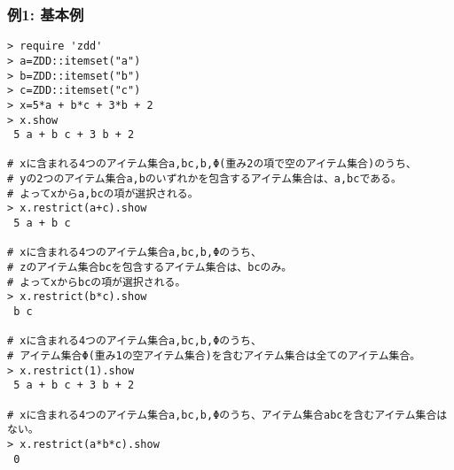\subsubsection*{例1: 基本例}



\begin{Verbatim}[baselinestretch=0.7,frame=single]
> require 'zdd'
> a=ZDD::itemset("a")
> b=ZDD::itemset("b")
> c=ZDD::itemset("c")
> x=5*a + b*c + 3*b + 2
> x.show
 5 a + b c + 3 b + 2

# xに含まれる4つのアイテム集合a,bc,b,Φ(重み2の項で空のアイテム集合)のうち、
# yの2つのアイテム集合a,bのいずれかを包含するアイテム集合は、a,bcである。
# よってxからa,bcの項が選択される。
> x.restrict(a+c).show
 5 a + b c

# xに含まれる4つのアイテム集合a,bc,b,Φのうち、
# zのアイテム集合bcを包含するアイテム集合は、bcのみ。
# よってxからbcの項が選択される。
> x.restrict(b*c).show
 b c

# xに含まれる4つのアイテム集合a,bc,b,Φのうち、
# アイテム集合Φ(重み1の空アイテム集合)を含むアイテム集合は全てのアイテム集合。
> x.restrict(1).show
 5 a + b c + 3 b + 2

# xに含まれる4つのアイテム集合a,bc,b,Φのうち、アイテム集合abcを含むアイテム集合はない。
> x.restrict(a*b*c).show
 0
\end{Verbatim}
